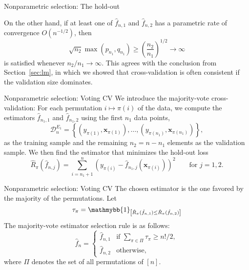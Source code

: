 \documentclass{beamer}
\newcommand{\0}{\emptyset}
\newcommand{\paren}[1]{\left(#1 \right)}
\newcommand{\sqbr}[1]{\left[#1 \right]}
\newcommand{\set}[1]{\left\{ #1 \right\}}
\newcommand{\ind}[1]{\mathmybb{1}_{\sqbr{#1}}}
\newcommand{\data}{\mathcal{D}_{n}}
\newcommand{\x}{\boldsymbol{x}}
\newcommand{\fhat}[2]{\hat{f}_{#1, #2}}
\newcommand{\1}{\mathmybb{1}}
\begin{document}
\begin{frame}{Nonparametric selection: The hold-out}
  \begin{example}
    On the other hand, if at least one of \(\fhat{n}{1}\) and \(\fhat{n}{2}\) has a parametric rate of convergence \(O(n^{-1/2})\), then
    \[\sqrt{n_{2}}\max(p_{n_{1}},q_{n_{1}})\geq \paren{\frac{n_{2}}{n_{1}}}^{1/2}\to\infty\]
    is satisfied whenever \(n_{2}/n_{1}\to\infty\). This agrees with the conclusion from Section~\ref{sec:lm}, in which we showed that cross-validation is often consistent if the validation size dominates.
  \end{example}
\end{frame}

\begin{frame}{Nonparametric selection: Voting CV}
   We introduce the \alert{majority-vote cross-validation}: For each permutation \(i\mapsto\pi(i)\) of the data, we compute the estimators \(\fhat{n_{1}}{1}\) and \(\fhat{n_{1}}{2}\) using the first \(n_{1}\) data points,
  \[\data^{E_{1}} = \set{\paren{y_{\pi(1)}, \x_{\pi(1)}}, \ldots,\paren{y_{\pi(n_1)}, \x_{\pi(n_1)}}},\]
  as the training sample and the remaining \(n_{2}=n-n_{1}\) elements as the validation sample. We then find the estimator that minimizes the hold-out loss
  \[\hat{R}_{\pi}(\fhat{n}{j}) = \sum_{i=n_{1}+1}^{n}\paren{y_{\pi(i)} - \fhat{n_{1}}{j}\paren{\x_{\pi(i)}}}^{2}\qquad \text{for }j=1,2.\]
\end{frame}

\begin{frame}{Nonparametric selection: Voting CV}
  The chosen estimator is the one favored by the majority of the permutations.
  Let 
  \[\tau_{\pi} = \ind{\hat{R}_{\pi}(\fhat{n}{1}) \leq \hat{R}_{\pi}(\fhat{n}{2})}\]
  The majority-vote estimator selection rule is as follows:
  \[\hat{f}_{n} = \begin{cases}
      \fhat{n}{1} &\text{if }\sum_{\pi\in\Pi}\tau_{\pi} \geq {n!}/{2},\\[2mm]
      \fhat{n}{2} &\text{otherwise,}
  \end{cases}\]
  where \(\Pi\) denotes the set of all permutations of \([n]\).
\end{frame}
\end{document}
